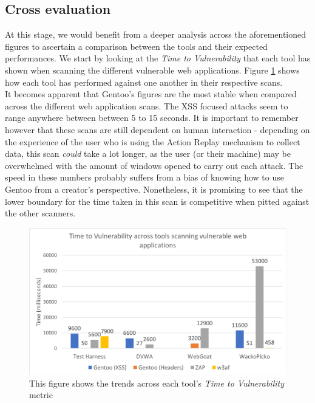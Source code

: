 \subsection{Cross evaluation}

At this stage, we would benefit from a deeper analysis across the aforementioned figures to ascertain a comparison between the tools and their expected performances. We start by looking at the \textit{Time to Vulnerability} that each tool has shown when scanning the different vulnerable web applications. Figure \ref{fig:time_to_vuln} shows how each tool has performed against one another in their respective scans. \\ 

It becomes apparent that Gentoo's figures are the most stable when compared across the different web application scans. The XSS focused attacks seem to range anywhere between between 5 to 15 seconds. It is important to remember however that these scans are still dependent on human interaction - depending on the experience of the user who is using the Action Replay mechanism to collect data, this scan \textit{could} take a lot longer, as the user (or their machine) may be overwhelmed with the amount of windows opened to carry out each attack. The speed in these numbers probably suffers from a bias of knowing how to use Gentoo from a creator's perspective. Nonetheless, it is promising to see that the lower boundary for the time taken in this scan is competitive when pitted against the other scanners. \\

\begin{figure}[h]
	\centering
	\includegraphics[width=\textwidth]{images/evaluation/time_to_vuln.png}
	\caption{This figure shows the trends across each tool's \textit{Time to Vulnerability} metric}
	\label{fig:time_to_vuln}
\end{figure}


